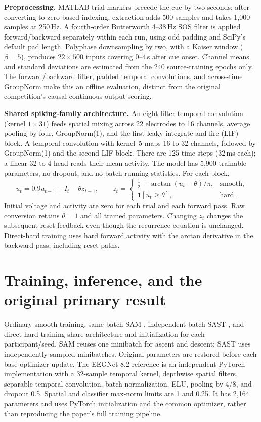 \documentclass[11pt,a4paper]{article}
\begin{document}
\textbf{Preprocessing.} MATLAB trial markers precede the cue by two seconds;
after converting to zero-based indexing, extraction adds 500 samples and
takes 1,000 samples at 250\,Hz. A fourth-order Butterworth 4--38\,Hz SOS filter
is applied forward/backward separately within each run, using odd padding
and SciPy's default pad length. Polyphase downsampling by two, with a Kaiser
window ($\beta=5$), produces $22\times500$ inputs covering 0--4\,s after cue
onset. Channel means and standard deviations are estimated from the 240
source-training epochs only. The forward/backward filter, padded temporal
convolutions, and across-time GroupNorm make this an offline evaluation,
distinct from the original competition's causal continuous-output scoring.

\textbf{Shared spiking-family architecture.} An eight-filter temporal
convolution (kernel $1\times31$) feeds spatial mixing across 22 electrodes
to 16 channels, average pooling by four, GroupNorm(1), and the first
leaky integrate-and-fire (LIF) block. A temporal convolution with kernel~5
maps 16 to 32 channels, followed by GroupNorm(1) and the second LIF block.
There are 125 time steps (32\,ms each); a linear 32-to-4 head reads their
mean activity. The model has 5,900 trainable parameters, no dropout, and no
batch running statistics. For each block,
\[
u_t=0.9u_{t-1}+I_t-\theta z_{t-1},\qquad
z_t=\begin{cases}
\tfrac12+\arctan(u_t-\theta)/\pi,&\text{smooth},\\
\mathbf{1}[u_t\geq\theta],&\text{hard}.
\end{cases}
\]
Initial voltage and activity are zero for each trial and each forward pass.
Raw conversion retains $\theta=1$ and all trained parameters. Changing
$z_t$ changes the subsequent reset feedback even though the recurrence
equation is unchanged. Direct-hard training uses hard forward activity
with the arctan derivative in the backward pass, including reset paths.

\clearpage
\section{Training, inference, and the original primary result}

Ordinary smooth training, same-batch SAM \citep{foret}, independent-batch SAST
\citep{nicholson}, and direct-hard training share architecture and initialization
for each participant/seed. SAM reuses one minibatch for ascent and descent;
SAST uses independently sampled minibatches. Original parameters are restored
before each base-optimizer update. The EEGNet-8,2 reference \citep{lawhern} is
an independent PyTorch implementation with a 32-sample temporal kernel,
depthwise spatial filters, separable temporal convolution, batch normalization,
ELU, pooling by 4/8, and dropout 0.5. Spatial and classifier max-norm limits
are 1 and 0.25. It has 2,164 parameters and uses PyTorch initialization and
the common optimizer, rather than reproducing the paper's full training
pipeline.
\end{document}
